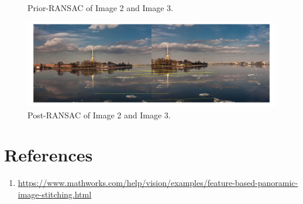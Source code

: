 \documentclass[english]{article}
\begin{document}
\begin{enumerate}
\begin{figure}[H]
          \caption{Prior-RANSAC of Image 2 and Image 3.}
          \label{fig:priorransac2}
        \end{figure}
        \begin{figure}[H]
          \centering
          \includegraphics[width=1\textwidth]{postransac2.jpg}
          \caption{Post-RANSAC of Image 2 and Image 3.}
          \label{fig:postransac2}
        \end{figure}
\end{enumerate}
\section{References}
\begin{enumerate}
  \item \url{https://www.mathworks.com/help/vision/examples/feature-based-panoramic-image-stitching.html}
\end{enumerate}
\end{document}
